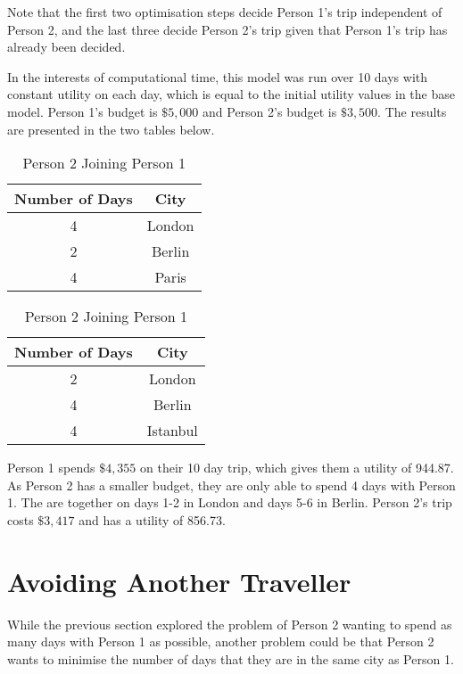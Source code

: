 \documentclass[12pt]{article}
\begin{document}
Note that the first two optimisation steps decide Person 1's trip independent of Person 2, and the last three decide Person 2's trip given that Person 1's trip has already been decided.

In the interests of computational time, this model was run over 10 days with constant utility on each day, which is equal to the initial utility values in the base model. Person 1's budget is $\$5,000$ and Person 2's budget is $\$3,500$. The results are presented in the two tables below.

\begin{table}[ht!]
	\centering
	\begin{minipage}{0.48\textwidth}
		\centering
		\begin{tabular}{| c || c |}
			\hline
			Number of Days & City \\ \hline \hline
			4 & London \\ \hline
			2 & Berlin \\ \hline
			4 & Paris \\ \hline
		\end{tabular}
		\caption{Person 1}
		\label{person_1_meetup}
	\end{minipage}
	\hfill
	\begin{minipage}{0.48\textwidth}
		\centering
		\begin{tabular}{| c || c |}
			\hline
			Number of Days & City \\ \hline \hline
			2 & London \\ \hline
			4 & Berlin \\ \hline
			4 & Istanbul \\ \hline
		\end{tabular}
			\caption{Person 2 Joining Person 1}
		\label{person_2_meetup}
	\end{minipage}
\end{table}

Person 1 spends $\$4,355$ on their 10 day trip, which gives them a utility of 944.87. As Person 2 has a smaller budget, they are only able to spend 4 days with Person 1. The are together on days 1-2 in London and days 5-6 in Berlin. Person 2's trip costs $\$3,417$ and has a utility of 856.73.

\section{Avoiding Another Traveller}

While the previous section explored the problem of Person 2 wanting to spend as many days with Person 1 as possible, another problem could be that Person 2 wants to minimise the number of days that they are in the same city as Person 1.
\end{document}
